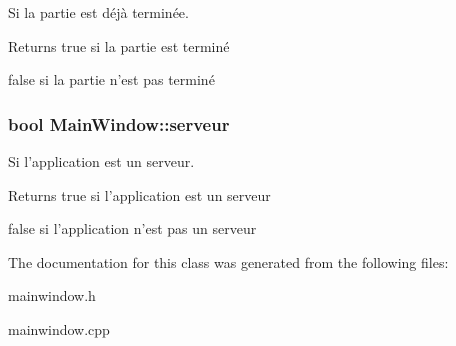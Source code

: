 Si la partie est déjà terminée. 

\begin{DoxyReturn}{Returns}
true si la partie est terminé 

false si la partie n'est pas terminé 
\end{DoxyReturn}
\hypertarget{class_main_window_ac4fe06d6d85536567fd86733f8cdf6c9}{
\subsubsection[{serveur}]{\setlength{\rightskip}{0pt plus 5cm}bool Main\-Window\-::serveur}}\label{class_main_window_ac4fe06d6d85536567fd86733f8cdf6c9}


Si l'application est un serveur. 

\begin{DoxyReturn}{Returns}
true si l'application est un serveur 

false si l'application n'est pas un serveur 
\end{DoxyReturn}


The documentation for this class was generated from the following files\-:\begin{DoxyCompactItemize}
\item 
mainwindow.\-h\item 
mainwindow.\-cpp\end{DoxyCompactItemize}

